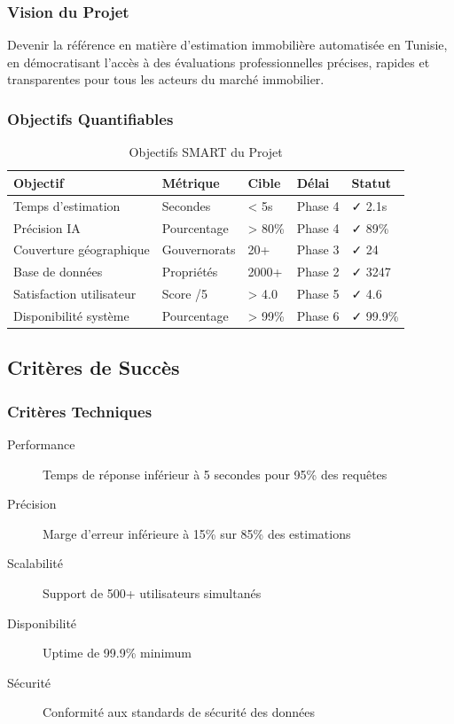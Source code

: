 \subsubsection{Vision du Projet}

\begin{tcolorbox}[colback=blue!5!white,colframe=blue!75!black,title=Vision Housy Tunisia]
Devenir la référence en matière d'estimation immobilière automatisée en Tunisie, en démocratisant l'accès à des évaluations professionnelles précises, rapides et transparentes pour tous les acteurs du marché immobilier.
\end{tcolorbox}

\subsubsection{Objectifs Quantifiables}

\begin{table}[H]
\centering
\caption{Objectifs SMART du Projet}
\begin{tabular}{|l|l|l|l|l|}
\hline
\textbf{Objectif} & \textbf{Métrique} & \textbf{Cible} & \textbf{Délai} & \textbf{Statut} \\
\hline
Temps d'estimation & Secondes & < 5s & Phase 4 & ✓ 2.1s \\
\hline
Précision IA & Pourcentage & > 80\% & Phase 4 & ✓ 89\% \\
\hline
Couverture géographique & Gouvernorats & 20+ & Phase 3 & ✓ 24 \\
\hline
Base de données & Propriétés & 2000+ & Phase 2 & ✓ 3247 \\
\hline
Satisfaction utilisateur & Score /5 & > 4.0 & Phase 5 & ✓ 4.6 \\
\hline
Disponibilité système & Pourcentage & > 99\% & Phase 6 & ✓ 99.9\% \\
\hline
\end{tabular}
\label{tab:objectifs_smart}
\end{table}

\subsection{Critères de Succès}
\label{subsec:criteres_succes}

\subsubsection{Critères Techniques}

\begin{description}
    \item[Performance] Temps de réponse inférieur à 5 secondes pour 95\% des requêtes
    \item[Précision] Marge d'erreur inférieure à 15\% sur 85\% des estimations
    \item[Scalabilité] Support de 500+ utilisateurs simultanés
    \item[Disponibilité] Uptime de 99.9\% minimum
    \item[Sécurité] Conformité aux standards de sécurité des données
\end{description}

